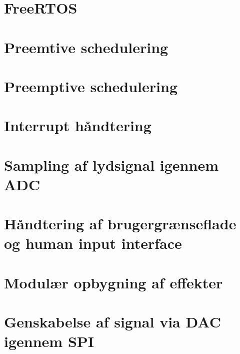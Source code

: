 \section{FreeRTOS}


\section{Preemtive schedulering}

\section{Preemptive schedulering}



\section{Interrupt håndtering}


\section{Sampling af lydsignal igennem ADC}


\section{Håndtering af brugergrænseflade og human input interface}

\section{Modulær opbygning af effekter}

\section{Genskabelse af signal via DAC igennem SPI}

